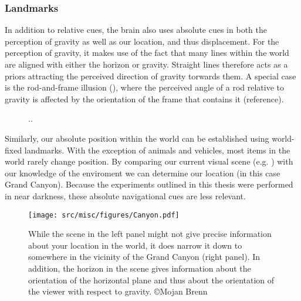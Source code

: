 \subsubsection{Landmarks}
In addition to relative cues, the brain also uses absolute cues in both the perception of gravity as well as our location, and thus displacement. For the perception of gravity, it makes use of the fact that many lines within the world are aligned with either the horizon or gravity. Straight lines therefore acts as a priors attracting the perceived direction of gravity torwards them. A special case is the rod-and-frame illusion (), where the perceived angle of a rod relative to gravity is affected by the orientation of the frame that contains it (reference). 

\begin{figure}
	\caption{..}
	\label{intro:fig9}
\end{figure}

Similarly, our absolute position within the world can be established using world-fixed landmarks. With the exception of animals and vehicles, most items in the world rarely change position. By comparing our current visual scene (e.g. ) with our knowledge of the enviroment we can determine our location (in this case Grand Canyon). Because the experiments outlined in this thesis were performed in near darkness, these absolute  navigational cues are less relevant. 

\begin{figure}
    \texttt{[image: src/misc/figures/Canyon.pdf]}
    
    \caption{While the scene in the left panel might not give precise information about your location in the world, it does narrow it down to somewhere in the vicinity of the Grand Canyon (right panel). In addition, the horizon in the scene gives information about the orientation of the horizontal plane and thus about the orientation of the viewer with respect to gravity. \copyright Mojan Brenn}
    \label{intro:fig1}
\end{figure}


